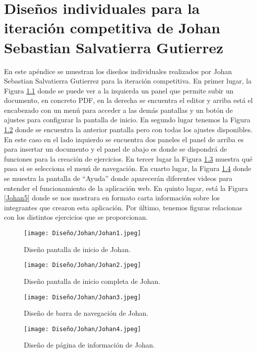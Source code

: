 \chapter{Diseños individuales para la iteración competitiva de Johan Sebastian Salvatierra Gutierrez}
\label{ape:disenyoJohan}

En este apéndice se muestran los diseños individuales realizados por Johan Sebastian Salvatierra Gutierrez para la iteración competitiva. En primer lugar, la Figura \ref{Johan1} donde se puede ver a la izquierda un panel que permite subir un documento, en concreto PDF, en la derecha se encuentra el editor y arriba está el encabezado con un menú para acceder a las demás pantallas y un botón de ajustes para configurar la pantalla de inicio. En segundo lugar tenemos la Figura \ref{Johan2} donde se encuentra la anterior pantalla pero con todas los ajustes disponibles. En este caso en el lado izquierdo se encuentra dos paneles el panel de arriba es para insertar un documento y el panel de abajo es donde se dispondrá de funciones para la creación de ejercicios. En tercer lugar la Figura \ref{Johan3} muestra qué pasa si se selecciona el menú de navegación. En cuarto lugar, la Figura \ref{Johan4} donde se muestra la pantalla de ``Ayuda'' donde aparecerán diferentes videos para entender el funcionamiento de la aplicación web. En quinto lugar, está la Figura \ref{Johan5} donde se nos mostrara en formato carta información sobre los integrantes que crearon esta aplicación. Por último, tenemos figuras relacionas con los distintos ejercicios que se proporcionan.

\begin{figure}[ht!]
  \centering
  \texttt{[image: Diseño/Johan/Johan1.jpeg]}
  \caption{Diseño pantalla de inicio de Johan.}
  \label{Johan1}
\end{figure}

\begin{figure}[ht!]
  \centering
  \texttt{[image: Diseño/Johan/Johan2.jpeg]}
  \caption{Diseño pantalla de inicio completa de Johan.}
  \label{Johan2}
\end{figure}

\begin{figure}[ht!]
  \centering
  \texttt{[image: Diseño/Johan/Johan3.jpeg]}
  \caption{Diseño de barra de navegación de Johan.}
  \label{Johan3}
\end{figure}

\begin{figure}[ht!]
  \centering
  \texttt{[image: Diseño/Johan/Johan4.jpeg]}
  \caption{Diseño de página de información de Johan.}
  \label{Johan4}
\end{figure}

